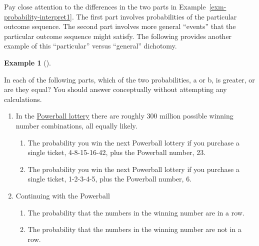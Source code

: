 \documentclass[
  letterpaper,
  DIV=11,
  numbers=noendperiod]{scrreprt}
\providecommand{\tightlist}{%
  \setlength{\itemsep}{0pt}\setlength{\parskip}{0pt}}
\theoremstyle{plain}
\theoremstyle{definition}
\newtheorem{example}{Example}[chapter]
\theoremstyle{definition}
\theoremstyle{definition}
\theoremstyle{remark}
\begin{document}

Pay close attention to the differences in the two parts in
Example~\ref{exm-probability-interpret1}. The first part involves
probabilities of the particular outcome sequence. The second part
involves more general ``events'' that the particular outcome sequence
might satisfy. The following provides another example of this
``particular'' versus ``general'' dichotomy.

\begin{tcolorbox}[enhanced jigsaw, opacityback=0, left=2mm, colframe=quarto-callout-note-color-frame, toprule=.15mm, breakable, colback=white, leftrule=.75mm, arc=.35mm, rightrule=.15mm, bottomrule=.15mm]

\begin{example}[]\protect\hypertarget{exm-probability-interpret2}{}\label{exm-probability-interpret2}

In each of the following parts, which of the two probabilities, a or b,
is greater, or are they equal? You should answer conceptually without
attempting any calculations.

\begin{enumerate}
\def\labelenumi{\arabic{enumi}.}
\item
  In the \href{https://www.powerball.com/}{Powerball lottery} there are
  roughly\footnotemark{} 300 million possible winning number
  combinations, all equally likely.

  \begin{enumerate}
  \def\labelenumii{\alph{enumii}.}
  \tightlist
  \item
    The probability you win the next Powerball lottery if you purchase a
    single ticket, 4-8-15-16-42, plus the Powerball number, 23.
  \item
    The probability you win the next Powerball lottery if you purchase a
    single ticket, 1-2-3-4-5, plus the Powerball number, 6.
  \end{enumerate}
\item
  Continuing with the Powerball

  \begin{enumerate}
  \def\labelenumii{\alph{enumii}.}
  \tightlist
  \item
    The probability that the numbers in the winning number are in a row.
  \item
    The probability that the numbers in the winning number are not in a
    row.
  \end{enumerate}
\end{enumerate}

\end{example}

\end{tcolorbox}
\end{document}

